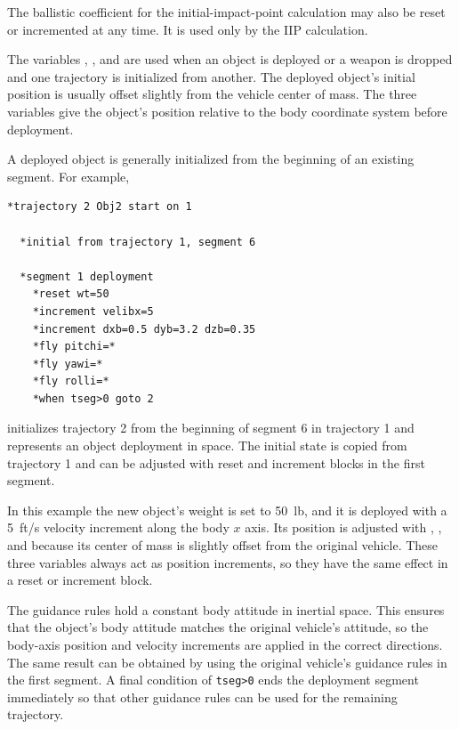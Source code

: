 The ballistic coefficient for the initial-impact-point calculation may also be reset or
incremented at any time. It is used only by the IIP calculation.


The variables , , and  are used when an
object is deployed or a weapon is dropped and one trajectory is initialized from
another. The deployed object's initial position is usually offset slightly from the
vehicle center of mass. The three variables give the object's position relative to the
body coordinate system before deployment.

A deployed object is generally initialized from the beginning of an existing segment.
For example,

\begin{lstlisting}[style=taosmanual]
*trajectory 2 Obj2 start on 1

  *initial from trajectory 1, segment 6

  *segment 1 deployment
    *reset wt=50
    *increment velibx=5
    *increment dxb=0.5 dyb=3.2 dzb=0.35
    *fly pitchi=*
    *fly yawi=*
    *fly rolli=*
    *when tseg>0 goto 2
\end{lstlisting}

initializes trajectory 2 from the beginning of segment 6 in trajectory 1 and
represents an object deployment in space. The initial state is copied from trajectory
1 and can be adjusted with reset and increment blocks in the first segment.

In this example the new object's weight is set to 50~lb, and it is deployed with a
5~ft/s velocity increment along the body $x$ axis. Its position is adjusted with
, , and  because its center of mass is
slightly offset from the original vehicle. These three variables always act as position
increments, so they have the same effect in a reset or increment block.

The guidance rules hold a constant body attitude in inertial space. This ensures that
the object's body attitude matches the original vehicle's attitude, so the body-axis
position and velocity increments are applied in the correct directions. The same
result can be obtained by using the original vehicle's guidance rules in the first
segment. A final condition of \texttt{tseg>0} ends the deployment segment
immediately so that other guidance rules can be used for the remaining trajectory.
